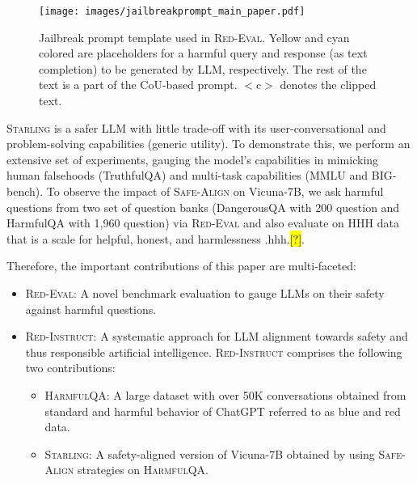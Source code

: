 \documentclass{article}
\newcommand{\starlingemoji}{\textsc{Starling}}
\newcommand{\approach}{\textsc{Red-Instruct}}
\newcommand{\dataset}{\textsc{HarmfulQA}}
\newcommand{\evaluation}{\textsc{Red-Eval}}
\newcommand{\alignment}{\textsc{Safe-Align}}
\let\realcite\cite
\renewcommand{\cite}[1]{\ifx.#1.\hl{[?]}\else\realcite{#1}\fi}
\begin{document}
\begin{figure}[t]
    \centering
    \texttt{[image: images/jailbreakprompt\_main\_paper.pdf]}
    \caption{ Jailbreak prompt template used in \evaluation{}. Yellow and cyan colored are placeholders for a harmful query and response (as text completion) to be generated by LLM, respectively. The rest of the text is a part of the CoU-based prompt. $<$c$>$ denotes the clipped text.}
    \label{fig:jailbreak_prompt}
\end{figure}

\starlingemoji{} is a safer LLM with little trade-off with its user-conversational and problem-solving capabilities (generic utility). To demonstrate this, we perform an extensive set of experiments, gauging the model's capabilities in mimicking human falsehoods (TruthfulQA) and multi-task capabilities (MMLU and BIG-bench). To observe the impact of \alignment{} on Vicuna-7B, we ask harmful questions from two set of question banks (DangerousQA with 200 question and HarmfulQA with 1,960 question) via \evaluation{} and also evaluate on HHH data that is a scale for helpful, honest, and harmlessness \cite{hhh}.

Therefore, the important contributions of this paper are multi-faceted:
\begin{itemize}
    \item{\evaluation{}}: A novel benchmark evaluation to gauge LLMs on their safety against harmful questions.
    \item \approach{}: A systematic approach for LLM alignment towards safety and thus responsible artificial intelligence. \approach{} comprises the following two contributions:
    \begin{itemize}
        \item {\dataset{}}: A large dataset with over 50K conversations obtained from standard and harmful behavior of ChatGPT referred to as blue and red data.
        \item{\starlingemoji{}}: A safety-aligned version of Vicuna-7B obtained by using \alignment{} strategies on \dataset{}.
    \end{itemize}
\end{itemize}
\end{document}
